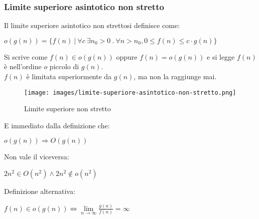 \subsubsection{Limite superiore asintotico non stretto}
\begin{definition}
Il limite superiore asintotico non strettosi definisce come:
\begin{center}
    $o(g(n)) = \{f(n) \: |\: \forall c \: \exists n_0 > 0 \: . \: \forall n > n_0, 0 \leq f(n) \leq c \cdot g(n) \}$
\end{center}
\end{definition}
\hspace{-15pt}Si scrive come $f(n) \in o(g(n))$ oppure $f(n) = o(g(n))$ e si legge $f(n)$ è nell'ordine $o$ piccolo di $g(n)$.\\
$f(n)$ è limitata superiormente da $g(n)$, ma non la raggiunge mai.\\
\begin{wrapfigure}[7]{l}{7cm}
    \vspace{-15pt}
    \centering
    \texttt{[image: images/limite-superiore-asintotico-non-stretto.png]}
    \vspace{-5pt}
    \caption{Limite superiore non stretto}
\end{wrapfigure}

\vspace{-15pt}
E immediato dalla definizione che:
\begin{center}
    $o(g(n)) \Longrightarrow O(g(n))$
\end{center}
Non vale il viceversa: 
\begin{center}
    $2n^2 \in O(n^2) \land 2n^2 \notin o(n^2)$
\end{center}
Definizione alternativa:
\begin{center}
    $f(n) \in o(g(n)) \Longleftrightarrow \lim\limits_{n\to \infty}\frac{g(n)}{f(n)} = \infty$
\end{center}

